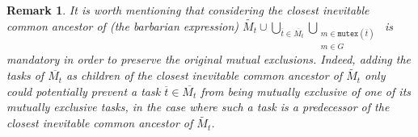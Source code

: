 \documentclass{article}
\newcommand{\mutexesof}[1]{\ensuremath{\mathtt{mutex}(#1)}}
\newtheorem{remark}{Remark}
\begin{document}
	\begin{remark}
		It is worth mentioning that considering the closest inevitable common ancestor of (the barbarian expression) $\tilde{M_t} \cup \bigcup\limits_{\overline{t} \in \overline{M_t}} \bigcup\limits_{\substack{m \in \mutexesof{\overline{t}} \\ m \in G}}$ is mandatory in order to preserve the original mutual exclusions.
		Indeed, adding the tasks of $\overline{M_t}$ as children of the closest inevitable common ancestor of $\tilde{M_t}$ only could potentially prevent a task $\overline{t} \in \overline{M_t}$ from being mutually exclusive of one of its mutually exclusive tasks, in the case where such a task is a predecessor of the closest inevitable common ancestor of $\tilde{M_t}$.
	\end{remark}
\end{document}
